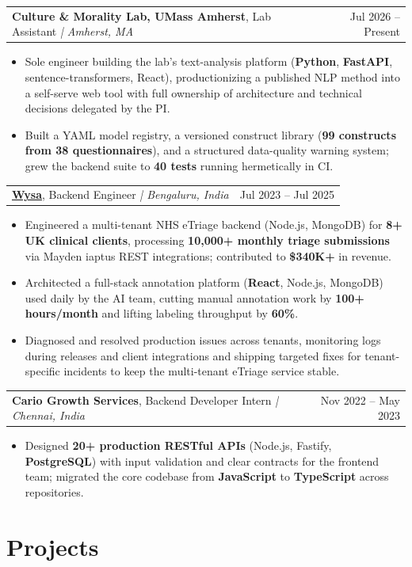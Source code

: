 \documentclass[letterpaper,11pt]{article}
\makeatletter
\newcommand{\expItem}[4]{%
  \vspace{2pt}
  \begin{tabular*}{\textwidth}{@{}l@{\extracolsep{\fill}}r@{}}
    \textbf{#1}, #2 \textit{| #3} & #4 \\
  \end{tabular*}\par\vspace{-3pt}
}
\makeatother
\begin{document}
\expItem{Culture \& Morality Lab, UMass Amherst}{Lab Assistant}{Amherst, MA}{Jul 2026 -- Present}
\begin{itemize}
  \item Sole engineer building the lab's text-analysis platform (\textbf{Python}, \textbf{FastAPI}, sentence-transformers, React), productionizing a published NLP method into a self-serve web tool with full ownership of architecture and technical decisions delegated by the PI.
  \item Built a YAML model registry, a versioned construct library (\textbf{99 constructs from 38 questionnaires}), and a structured data-quality warning system; grew the backend suite to \textbf{40 tests} running hermetically in CI.
\end{itemize}

\expItem{\href{https://www.wysa.io}{Wysa}}{Backend Engineer}{Bengaluru, India}{Jul 2023 -- Jul 2025}
\begin{itemize}
  \item Engineered a multi-tenant NHS eTriage backend (Node.js, MongoDB) for \textbf{8+ UK clinical clients}, processing \textbf{10{,}000+ monthly triage submissions} via Mayden iaptus REST integrations; contributed to \textbf{\$340K+} in revenue.
  \item Architected a full-stack annotation platform (\textbf{React}, Node.js, MongoDB) used daily by the AI team, cutting manual annotation work by \textbf{100+ hours/month} and lifting labeling throughput by \textbf{60\%}.
  \item Diagnosed and resolved production issues across tenants, monitoring logs during releases and client integrations and shipping targeted fixes for tenant-specific incidents to keep the multi-tenant eTriage service stable.
\end{itemize}

\expItem{Cario Growth Services}{Backend Developer Intern}{Chennai, India}{Nov 2022 -- May 2023}
\begin{itemize}
  \item Designed \textbf{20+ production RESTful APIs} (Node.js, Fastify, \textbf{PostgreSQL}) with input validation and clear contracts for the frontend team; migrated the core codebase from \textbf{JavaScript} to \textbf{TypeScript} across repositories.
\end{itemize}

\section{Projects}
\end{document}
